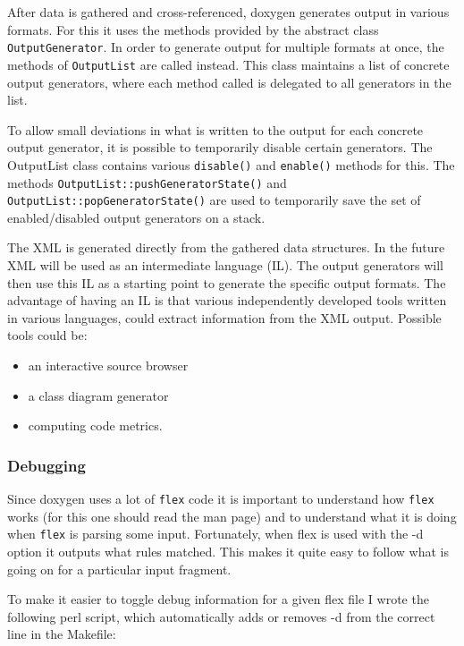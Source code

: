 After data is gathered and cross-referenced, doxygen generates output in various formats. For this it uses the methods provided by the abstract class {\tt OutputGenerator}. In order to generate output for multiple formats at once, the methods of {\tt OutputList} are called instead. This class maintains a list of concrete output generators, where each method called is delegated to all generators in the list.

To allow small deviations in what is written to the output for each concrete output generator, it is possible to temporarily disable certain generators. The OutputList class contains various {\tt disable()} and {\tt enable()} methods for this. The methods {\tt OutputList::pushGeneratorState()} and {\tt OutputList::popGeneratorState()} are used to temporarily save the set of enabled/disabled output generators on a stack.

The XML is generated directly from the gathered data structures. In the future XML will be used as an intermediate language (IL). The output generators will then use this IL as a starting point to generate the specific output formats. The advantage of having an IL is that various independently developed tools written in various languages, could extract information from the XML output. Possible tools could be:\begin{itemize}
\item an interactive source browser\item a class diagram generator\item computing code metrics.\end{itemize}


\subsubsection*{Debugging}

Since doxygen uses a lot of {\tt flex} code it is important to understand how {\tt flex} works (for this one should read the man page) and to understand what it is doing when {\tt flex} is parsing some input. Fortunately, when flex is used with the -d option it outputs what rules matched. This makes it quite easy to follow what is going on for a particular input fragment.

To make it easier to toggle debug information for a given flex file I wrote the following perl script, which automatically adds or removes -d from the correct line in the Makefile:



